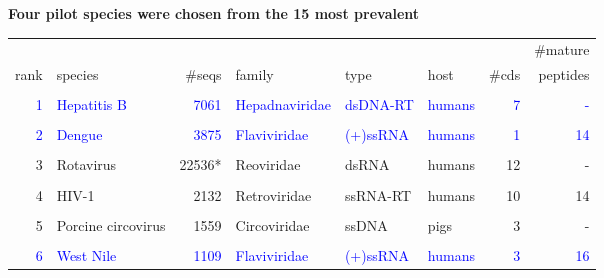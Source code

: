 \documentclass[landscape]{slides}
\begin{document}
\begin{slide}
\begin{center}

\textbf{Four pilot species were chosen from the 15 most prevalent}

\tiny
\begin{tabular}{r|l|r|l|l|l|r|r}
       &                    &              &                &          &        &       & \#mature \\ 
  rank & species            &       \#seqs & family         & type     & host   & \#cds & peptides \\ \hline
       &                    &              &                &          &        &       &          \\ 
\textcolor{blue}{1} & \textcolor{blue}{Hepatitis B}        &         \textcolor{blue}{7061} & \textcolor{blue}{Hepadnaviridae} & \textcolor{blue}{dsDNA-RT} & \textcolor{blue}{humans} &     \textcolor{blue}{7} &       \textcolor{blue}{-}  \\
       &                    &              &                &          &        &       &          \\ 
\textcolor{blue}{2} & \textcolor{blue}{Dengue}             &         \textcolor{blue}{3875} & \textcolor{blue}{Flaviviridae}   & \textcolor{blue}{(+)ssRNA} & \textcolor{blue}{humans} &     \textcolor{blue}{1} &      \textcolor{blue}{14}  \\
       &                    &              &                &          &        &       &          \\ 
     3 & Rotavirus          &      22536*  & Reoviridae     & dsRNA    & humans &    12 &       -  \\
       &                    &              &                &          &        &       &          \\ 
     4 & HIV-1              &        2132  & Retroviridae   & ssRNA-RT & humans &    10 &      14  \\
       &                    &              &                &          &        &       &          \\ 
     5 & Porcine circovirus &        1559  & Circoviridae   & ssDNA    & pigs   &     3 &       -  \\
       &                    &              &                &          &        &       &          \\ 
     \textcolor{blue}{6} & \textcolor{blue}{West Nile}          &        \textcolor{blue}{1109} & \textcolor{blue}{Flaviviridae}   & \textcolor{blue}{(+)ssRNA} & \textcolor{blue}{humans} &     \textcolor{blue}{3} &      \textcolor{blue}{16}  \\

\end{tabular}
\end{center}
\end{slide}
\end{document}
